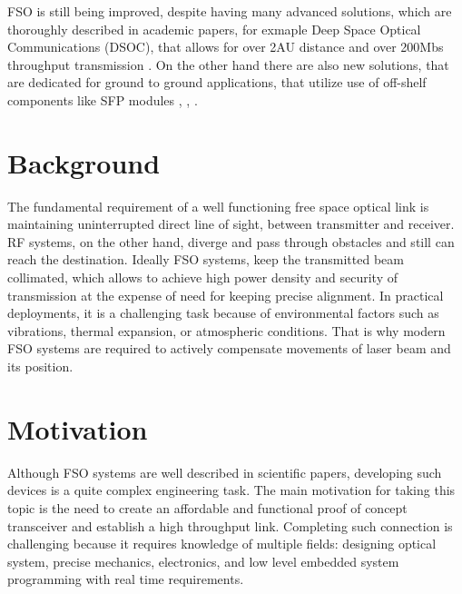 \documentclass[master,oneside,en,oldtitlepage]{dyplompwr}
\begin{document}
FSO is still being improved, despite having many advanced solutions, which are thoroughly described in academic papers, for exmaple Deep Space Optical Communications (DSOC), that allows for over 2AU distance and over 200Mbs throughput transmission \cite{driscoll2020deep}. 
On the other hand there are also new solutions, that are dedicated for ground to ground applications, that utilize use of off-shelf components like SFP modules \cite{selfhealacademic}, \cite{mustafa2016fso}, \cite{abadi2019implementation}.
\section{Background}

The fundamental requirement of a well functioning free space optical link is maintaining uninterrupted direct line of sight, between transmitter and receiver.
RF systems, on the other hand, diverge and pass through obstacles and still can reach the destination.
Ideally FSO systems, keep the transmitted beam collimated, which allows to achieve high power density and security of transmission at the expense of need for keeping precise alignment.
In practical deployments, it is a challenging task because of environmental factors such as vibrations, thermal expansion, or atmospheric conditions.
That is why modern FSO systems are required to actively compensate movements of laser beam and its position.


\section{Motivation}
Although FSO systems are well described in scientific papers, developing such devices is a quite complex engineering task.
The main motivation for taking this topic is the need to create an affordable and functional proof of concept transceiver and establish a high throughput link. 
Completing such connection is challenging because it requires knowledge of multiple fields: designing optical system, precise mechanics, electronics, and low level embedded system programming with real time requirements.   
\end{document}
